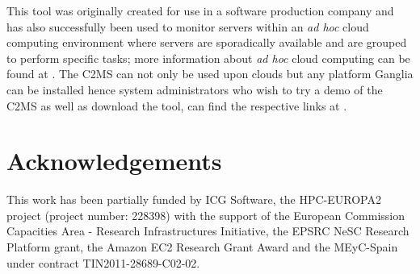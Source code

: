 \documentclass[10pt, conference, compsocconf]{IEEEtran}
\begin{document}
This tool was originally created for use in a software production company and has also successfully been used to monitor servers within an \textit{ad hoc} cloud computing environment where servers are sporadically available and are grouped to perform specific tasks; more information about \textit{ad hoc} cloud computing can be found at \cite{Kirby2010}. The C2MS can not only be used upon clouds but any platform Ganglia can be installed hence system administrators who wish to try a demo of the C2MS as well as download the tool, can find the respective links at \cite{c2ms_gary}.

\section*{Acknowledgements}
This work has been partially funded by ICG Software, the HPC-EUROPA2 project (project number: 228398) with the support of the European Commission Capacities Area - Research Infrastructures Initiative, the EPSRC NeSC Research Platform grant, the Amazon EC2 Research Grant Award and the MEyC-Spain under contract TIN2011-28689-C02-02.


	
\end{document}
